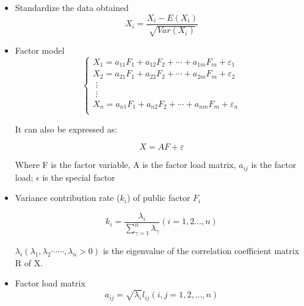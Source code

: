 \documentclass[12pt]{article}  %
\begin{document}
\begin{itemize}

    \item Standardize the data obtained
    \begin{equation}
    X_i=\frac{X_i-E\left( X_i \right)}{\sqrt{Var\left( X_i \right)}}
\end{equation}


    
    \item Factor model
\begin{equation}
    \begin{cases}
	X_1=a_{11}F_1+a_{12}F_2+\cdots +a_{1m}F_m+\varepsilon _1\\
	X_2=a_{21}F_1+a_{22}F_2+\cdots +a_{2m}F_m+\varepsilon _2\\
	\,\,\vdots\\
	\,\,\vdots\\
	X_n=a_{n1}F_1+a_{n2}F_2+\cdots +a_{nm}F_m+\varepsilon _n\\
    \end{cases}
\end{equation}

It can also be expressed as:

\begin{equation}
    X=AF+\varepsilon 
\end{equation}

Where F is the factor variable, A is the factor load matrix, $a_{ij}$ is the factor load; $\epsilon$ is the special factor





    \item Variance contribution rate (${k_i}$) of public factor $F_i$
    
    
    \begin{equation}
        k_i=\frac{\lambda _i}{\sum_{\gamma =1}^n{\lambda _{\gamma}}}\left( i=1,2...,n \right) 
    \end{equation}
    
    
$\lambda _i\left( \lambda _1,\lambda _2\cdots \cdots ,\lambda _n>0 \right) $
is the eigenvalue of the correlation coefficient matrix R of X.
    
    \item Factor load matrix
    \begin{equation}
            a_{ij}=\sqrt{\lambda _i}l_{ij}\left( i,j=1,2,...,n \right) 
    \end{equation}
    
    
    

\end{itemize}
\end{document}
